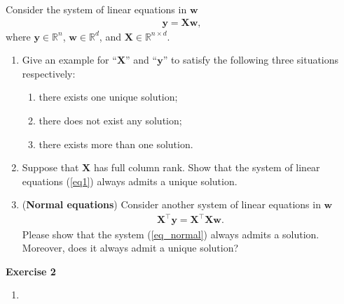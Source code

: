 \documentclass[11pt,letter,notitlepage]{article}
\begin{document}
\begin{exercise}

Consider the system of linear equations in $\mathbf{w}$
\begin{align}\label{eq1}
    \mathbf{y} = \mathbf{X} \mathbf{w} ,    
\end{align}
where $\mathbf{y} \in \mathbb{R}^{n}$, $\mathbf{w} \in \mathbb{R}^{d}$, and $\mathbf{X} \in \mathbb{R}^{n \times d}$.

\begin{enumerate}
    \item 
    
        Give an example for ``$\mathbf{X}$'' and ``$\mathbf{y}$'' to satisfy the following three situations respectively:
    \begin{enumerate}
        \item there exists one unique solution;
        \item there does not exist any solution;
        \item there exists more than one solution.
    \end{enumerate}
   
    \item 
    \iffalse
    Suppose that the equation (\ref{eq1}) admits a solution, prove that $\mathbf{y} \in \mathcal{C}(\mathbf{X})$ where $\mathcal{C}(\mathbf{X}) $ is the column space of $\mathbf{X}$.
    \fi
    Suppose that $\mathbf{X}$ has full column rank. Show that the system of linear equations (\ref{eq1}) always admits a unique solution.
        
    \item (\textbf{Normal equations}) Consider  another system of linear equations in $\mathbf{w}$
    \begin{align}\label{eq_normal}
        \mathbf{X}^{\top}\mathbf{y} = \mathbf{X}^{\top}\mathbf{X}\mathbf{w}. 
    \end{align}
    Please show that the system (\ref{eq_normal}) always admits a solution. Moreover, does it always admit a unique solution?
\end{enumerate}
    
\end{exercise}

\begin{solution}
	\textbf{Exercise 2}
	\begin{enumerate}
	 \item 
	 
	\end{enumerate}

\end{solution}
\end{document}
